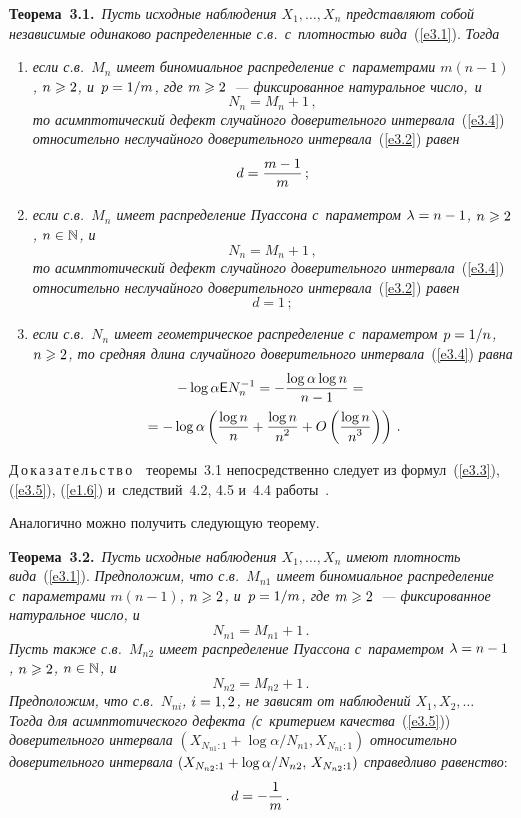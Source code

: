 \begin{multicols}{2}
\bigskip

\noindent
\textbf{Теорема~3.1.}\
\textit{Пусть исходные наблюдения $X_1,\ldots,X_n$ 
представляют собой независимые одинаково распределенные 
с.в.\ с~плотностью вида}~(\ref{e3.1}). \textit{Тогда}
\begin{enumerate}[(1)]
\item \textit{если с.в.~$M_n$ имеет биномиальное распределение 
с~параметрами $m(n-1)$, $n\hm \geqslant 2$, 
и~$p\hm = 1/m$, где $m\hm \geqslant 2$~--- фиксированное натуральное чис\-ло,~и}
$$
N_n = M_n + 1\,,
$$
\textit{то асимптотический дефект случайного доверительного интервала}~(\ref{e3.4}) 
\textit{относительно неслучайного доверительного интервала}~(\ref{e3.2}) \textit{равен}
$$
d = \displaystyle\frac{\displaystyle m - 1\mathstrut}{\displaystyle m\mathstrut}\,;
$$

\item \textit{если с.в.~$M_n$ имеет распределение Пуассона 
с~параметром $\lambda\hm = n\hm - 1$, $n\hm \geqslant 2$, 
$n\hm \in \mathbb{N}$, и}
$$
N_n = M_n + 1\,,
$$
\textit{то асимптотический дефект случайного доверительного интервала}~(\ref{e3.4}) 
\textit{относительно неслучайного доверительного интервала}~(\ref{e3.2}) \textit{равен}
$$
d = 1\,;
$$

\item 
\textit{если с.в.~$N_n$ имеет геометрическое распределение 
с~параметром $p\hm = 1/n$, $n\hm \geqslant 2$, то средняя длина случайного 
доверительного интервала}~(\ref{e3.4}) \textit{равна}
\begin{multline*}
-\log\alpha {\sf E} N_n^{-1} = - \displaystyle\frac{\displaystyle \log\alpha\log n\mathstrut}{\displaystyle n - 1\mathstrut} = {}\\
{}=
- \log\alpha \left(\displaystyle\frac{\displaystyle \log n\mathstrut}{\displaystyle n\mathstrut} + \displaystyle\frac{\displaystyle \log n\mathstrut}{\displaystyle n^2\mathstrut} + O
\left(\displaystyle\frac{\displaystyle \log n\mathstrut}{\displaystyle n^3\mathstrut}\right)\right)\,.
\end{multline*}
\end{enumerate}

\noindent
Д\,о\,к\,а\,з\,а\,т\,е\,л\,ь\,с\,т\,в\,о~~теоремы~3.1 непосредственно следует 
из формул~(\ref{e3.3}), (\ref{e3.5}), (\ref{e1.6}) и~следствий~4.2, 4.5 
и~4.4 работы~\cite{2-ben}.

Аналогично можно получить следующую тео\-рему.

\bigskip

\noindent
\textbf{Теорема~3.2.}\ \textit{Пусть исходные наблюдения $X_1,\ldots,X_n$ 
имеют плотность вида}~(\ref{e3.1}). 
\textit{Предположим, что с.в.~$M_{n1}$ 
имеет биномиальное распределение с~па\-ра\-мет\-ра\-ми $m(n-1)$, $n\hm \geqslant 2$, и~$p\hm = 1/m$, где $m\hm \geqslant 2$~--- фиксированное натуральное число, и~$$
N_{n1} = M_{n1} + 1\,.
$$
Пусть также с.в.~$M_{n2}$ имеет распределение 
Пуассона с~параметром $\lambda\hm = n\hm - 1$, $n\hm \geqslant 2$,
$n\hm \in \mathbb{N}$, и}
$$
N_{n2} = M_{n2} + 1\,.
$$
\textit{Предположим, что с.в.~$N_{ni}$, $i\hm = 1,2$, не зависят 
от наблюдений $X_1, X_2,\ldots$
Тогда для асимптотического дефекта (с~критерием качества}~(\ref{e3.5})) 
\textit{доверительного интервала}
$\left(X_{N_ {n1}:1} + \log\alpha/{N_{n1}},\right.$\linebreak $\left.X_{N_{n1}:1}\right)$
\textit{относительно доверительного интервала}
$\left(X_{N_{n2}:1} \hm+ {\log\alpha}/{N_{n2}},\, X_{N_{n2}:1}\right)$
\textit{справедливо равенство}:
$$
d = - \displaystyle\frac{\displaystyle 1\mathstrut}{\displaystyle m\mathstrut}\,.
$$


\end{multicols}
